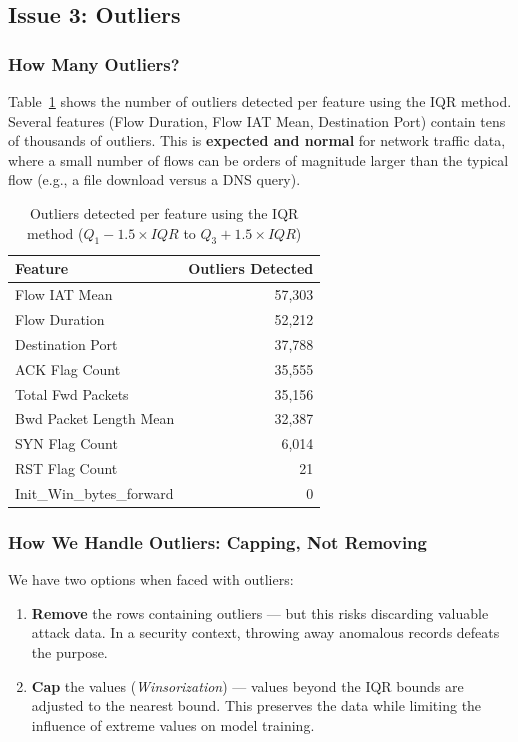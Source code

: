 \subsection{Issue 3: Outliers}

\subsubsection{How Many Outliers?}

Table~\ref{tab:outliers} shows the number of outliers detected per feature using the IQR method. Several features (Flow Duration, Flow IAT Mean, Destination Port) contain tens of thousands of outliers. This is \textbf{expected and normal} for network traffic data, where a small number of flows can be orders of magnitude larger than the typical flow (e.g., a file download versus a DNS query).

\begin{table}[H]
\centering
\caption{Outliers detected per feature using the IQR method ($Q_1 - 1.5 \times IQR$ to $Q_3 + 1.5 \times IQR$)}
\label{tab:outliers}
\begin{tabular}{lr}
\toprule
\textbf{Feature} & \textbf{Outliers Detected} \\
\midrule
Flow IAT Mean & 57,303 \\
Flow Duration & 52,212 \\
Destination Port & 37,788 \\
ACK Flag Count & 35,555 \\
Total Fwd Packets & 35,156 \\
Bwd Packet Length Mean & 32,387 \\
SYN Flag Count & 6,014 \\
RST Flag Count & 21 \\
Init\_Win\_bytes\_forward & 0 \\
\bottomrule
\end{tabular}
\end{table}

\subsubsection{How We Handle Outliers: Capping, Not Removing}

We have two options when faced with outliers:
\begin{enumerate}
    \item \textbf{Remove} the rows containing outliers --- but this risks discarding valuable attack data. In a security context, throwing away anomalous records defeats the purpose.
    \item \textbf{Cap} the values (\textit{Winsorization}) --- values beyond the IQR bounds are adjusted to the nearest bound. This preserves the data while limiting the influence of extreme values on model training.
\end{enumerate}

